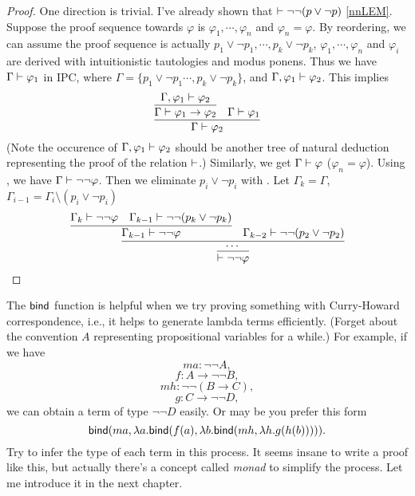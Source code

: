 \begin{proof}
    One direction is trivial. 
    I've already shown that $\vdash \neg\neg(p\vee\neg p)$ 
    \eqref{nnLEM}.
    Suppose the proof sequence towards $\varphi$ is $\varphi_1,\cdots,
    \varphi_n$ and $\varphi_n=\varphi$. By reordering, we can assume
    the proof sequence is actually $p_1\vee\neg p_1,\cdots, 
    p_k\vee\neg p_k$, $\varphi_1,\cdots,\varphi_n$ and $\varphi_i$ are
    derived with intuitionistic tautologies and modus ponens. Thus
    we have $\Gamma\vdash \varphi_1$ in IPC, where 
    $\Gamma=\{p_1\vee\neg p_1\cdots,p_k\vee\neg p_k\}$,
    and $\Gamma,\varphi_1\vdash\varphi_2$. This implies
    $$
        \infer{\Gamma\proves\varphi_2}{
            \infer{\Gamma\proves\varphi_1\to\varphi_2}{
                \Gamma,\varphi_1\proves\varphi_2
            }
            &
            \Gamma\proves\varphi_1
        }
    $$
    (Note the occurence of $\Gamma,\varphi_1\vdash\varphi_2$ should be
    another tree of natural deduction representing the proof of the 
    relation $\vdash$.)
    Similarly, we get $\Gamma\vdash \varphi$ ($\varphi_n=\varphi$).
    Using , we have $\Gamma\vdash\neg\neg\varphi$.
    Then we eliminate $p_i\vee\neg p_i$ with .
    Let $\Gamma_k=\Gamma$, $\Gamma_{i-1}=\Gamma_i\setminus(p_i\vee\neg p_i)$
    $$
        \infer{\proves \neg\neg\varphi}{\infer{\cdots}{
            \infer{\Gamma_{k-1}\proves \neg\neg\varphi}{
                \Gamma_k\proves \neg\neg\varphi
                &
                \Gamma_{k-1}\proves \neg\neg(p_k\vee\neg p_k)
            }
            &
            \Gamma_{k-2}\proves \neg\neg(p_2\vee\neg p_2)
        }}
    $$
\end{proof}

\begin{remark}
    The $\text{\sf bind}$ function is helpful when we try proving something
    with Curry-Howard correspondence, i.e., it helps to generate
    lambda terms efficiently. (Forget about the convention $A$ 
    representing propositional variables for a while.)
    For example, if we have
    $$ma:\neg\neg A,$$
    $$f: A\to\neg\neg B,$$
    $$mh:\neg\neg(B\to C),$$
    $$g: C\to\neg\neg D,$$
    we can obtain a term of type $\neg\neg D$ easily.
    Or may be you prefer this form
    $$
        \text{\sf bind}(ma,\lambda a.\text{\sf bind}(f(a),\lambda b.\text{\sf bind}(mh,\lambda h.g(h(b))))).
    $$
    Try to infer the type of each term in this process. 
    It seems insane to write a proof like this, but actually there's a
    concept called {\it monad} to simplify the process. Let me introduce
    it in the next chapter. 
\end{remark}
